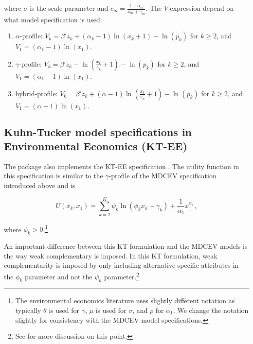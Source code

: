 \noindent where \(\sigma\) is the scale parameter and
\(c_m = \frac{1-\alpha_m}{x_m+ \gamma_m}\). The \(V\) expression depend
on what model specification is used:

\begin{enumerate}
\def\labelenumi{\arabic{enumi}.}
\item
  \(\alpha\)-profile:
  \(V_k = \beta' z_k + (\alpha_k-1)\ln\left( x_k + 1 \right) - \ln \left(p_k\right)\)
  for \(k \geq 2\), and \(V_1 = (\alpha_1-1)\ln(x_1)\).
\item
  \(\gamma\)-profile:
  \(V_k = \beta' z_k - \ln\left( \frac{x_k}{\gamma_k} + 1 \right) - \ln \left(p_k\right)\)
  for \(k \geq 2\), and \(V_1 = (\alpha_1-1)\ln(x_1)\).
\item
  hybrid-profile:
  \(V_k = \beta' z_k + (\alpha-1)\ln\left( \frac{x_k}{\gamma_k} + 1 \right) - \ln \left(p_k\right)\)
  for \(k \geq 2\), and \(V_1 = (\alpha-1)\ln(x_1)\).
\end{enumerate}

\hypertarget{kuhn-tucker-model-specifications-in-environmental-economics-kt-ee}{%
\subsection{Kuhn-Tucker model specifications in Environmental Economics
(KT-EE)}\label{kuhn-tucker-model-specifications-in-environmental-economics-kt-ee}}

The  package also implements the KT-EE specification
\citep{vonhaefenkuhn-tucker2005}. The utility function in this
specification is similar to the \(\gamma\)-profile of the MDCEV
specification introduced above and is

\begin{equation}
U(x_k, x_1) = \sum_{k=2}^{K}\psi_k \ln \left(\phi_kx_k + \gamma_k \right) + \frac{1}{\alpha_1}x_1^{\alpha_1}, 
\label{eq:util_kt_ee}
\end{equation}

\noindent where \(\phi_k >0\).\footnote{The environmental economics
  literature uses slightly different notation as typically \(\theta\) is
  used for \(\gamma\), \(\mu\) is used for \(\sigma\), and \(\rho\) for
  \(\alpha_1\). We change the notation slightly for consistency with the
  MDCEV model specifications.}

An important difference between this KT formulation and the MDCEV models
is the way weak complementary is imposed. In this KT formulation, weak
complementarity is imposed by only including alternative-specific
attributes in the \(\phi_k\) parameter and not the \(\psi_k\)
parameter.\footnote{See \citet{herrigeswhats2004} for more discussion on
  this point.}

